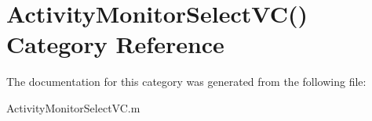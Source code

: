 \hypertarget{category_activity_monitor_select_v_c_07_08}{\section{Activity\-Monitor\-Select\-V\-C() Category Reference}
\label{category_activity_monitor_select_v_c_07_08}
}


The documentation for this category was generated from the following file\-:\begin{DoxyCompactItemize}
\item 
Activity\-Monitor\-Select\-V\-C.\-m\end{DoxyCompactItemize}
